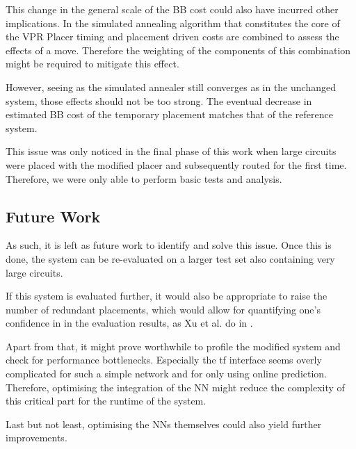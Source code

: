 This change in the general scale of the \gls{BB} cost could also have incurred other implications. In the simulated annealing algorithm that constitutes the core of the \gls{VPR} Placer timing and placement driven costs are combined to assess the effects of a move. Therefore the weighting of the components of this combination might be required to mitigate this effect.

However, seeing as the simulated annealer still converges as in the unchanged system, those effects should not be too strong. The eventual decrease in estimated \gls{BB} cost of the temporary placement matches that of the reference system.

\pagebreak

This issue was only noticed in the final phase of this work when large circuits were placed with the modified placer and subsequently routed for the first time. Therefore, we were only able to perform basic tests and analysis.

\subsection{Future Work}

As such, it is left as future work to identify and solve this issue. Once this is done, the system can be re-evaluated on a larger test set also containing very large circuits. 

If this system is evaluated further, it would also be appropriate to raise the number of redundant placements, which would allow for quantifying one's confidence in in the evaluation results, as Xu et al. do in \cite{star-plus-paper}.

Apart from that, it might prove worthwhile to profile the modified system and check for performance bottlenecks. Especially the \gls{tf} interface seems overly complicated for such a simple network and for only using online prediction. Therefore, optimising the integration of the \gls{NN} might reduce the complexity of this critical part for the runtime of the system.

Last but not least, optimising the \glspl{NN} themselves could also yield further improvements.
